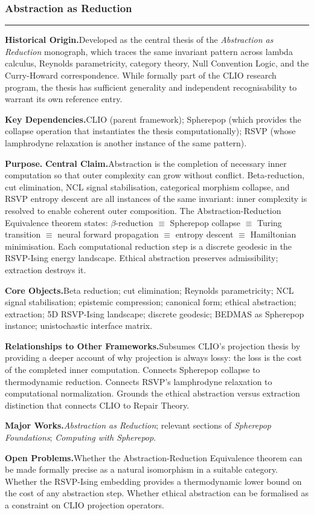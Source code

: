 \documentclass[12pt, twoside]{article}
\newcommand{\frameworkhead}[5]{  \subsubsection{#1}
  \noindent\textcolor{#2}{\rule{\linewidth}{0.8pt}}
  \smallskip

  \noindent\textbf{Historical Origin.}\quad #3

  \noindent\textbf{Key Dependencies.}\quad #4

  \noindent\textbf{Purpose.}\quad #5
}
\newcommand{\frameworkbody}[5]{  \noindent\textbf{Central Claim.}\quad #1

  \noindent\textbf{Core Objects.}\quad #2

  \noindent\textbf{Relationships to Other Frameworks.}\quad #3

  \noindent\textbf{Major Works.}\quad #4

  \noindent\textbf{Open Problems.}\quad #5
  \medskip
}
\begin{document}
\frameworkhead{Abstraction as Reduction}{cliogreen}{Developed as the central thesis of the \emph{Abstraction as Reduction}
monograph, which traces the same invariant pattern across lambda calculus,
Reynolds parametricity, category theory, Null Convention Logic, and the
Curry-Howard correspondence. While formally part of the CLIO research
program, the thesis has sufficient generality and independent recognisability
to warrant its own reference entry.}{CLIO (parent framework); Spherepop (which provides the collapse operation
that instantiates the thesis computationally); RSVP (whose lamphrodyne
relaxation is another instance of the same pattern).}
\frameworkbody{Abstraction is the completion of necessary inner computation so
that outer complexity can grow without conflict. Beta-reduction, cut
elimination, NCL signal stabilisation, categorical morphism collapse, and
RSVP entropy descent are all instances of the same invariant: inner
complexity is resolved to enable coherent outer composition. The
Abstraction-Reduction Equivalence theorem states: $\beta$-reduction $\equiv$
Spherepop collapse $\equiv$ Turing transition $\equiv$ neural forward
propagation $\equiv$ entropy descent $\equiv$ Hamiltonian minimisation. Each
computational reduction step is a discrete geodesic in the RSVP-Ising energy
landscape. Ethical abstraction preserves admissibility; extraction destroys
it.}{Beta reduction; cut elimination; Reynolds parametricity; NCL signal
stabilisation; epistemic compression; canonical form; ethical abstraction;
extraction; 5D RSVP-Ising landscape; discrete geodesic; BEDMAS as Spherepop
instance; unistochastic interface matrix.}{Subsumes CLIO's projection thesis by providing a deeper account of why
projection is always lossy: the loss is the cost of the completed inner
computation. Connects Spherepop collapse to thermodynamic reduction. Connects
RSVP's lamphrodyne relaxation to computational normalization. Grounds the
ethical abstraction versus extraction distinction that connects CLIO to
Repair Theory.}{\emph{Abstraction as Reduction}; relevant sections of \emph{Spherepop
Foundations}; \emph{Computing with Spherepop}.}{Whether the Abstraction-Reduction Equivalence theorem can be made
formally precise as a natural isomorphism in a suitable category. Whether
the RSVP-Ising embedding provides a thermodynamic lower bound on the cost
of any abstraction step. Whether ethical abstraction can be formalised as
a constraint on CLIO projection operators.}
\end{document}
